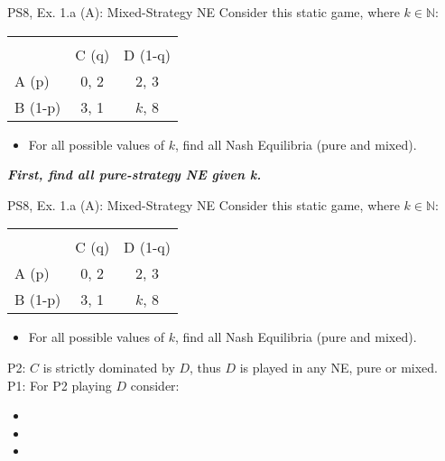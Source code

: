 \begin{frame}{PS8, Ex. 1.a (A): Mixed-Strategy NE}
    Consider this static game, where $k\in\mathbb{N}:$
    \vspace{-16pt}
    \begin{table}
      \begin{tabular}{l|c|c|}
        \multicolumn{1}{c}{} & \multicolumn{2}{c}{} \\
        \multicolumn{1}{c}{} & \multicolumn{1}{c}{C (q)} & \multicolumn{1}{c}{D (1-q)} \\\cline{2-3}
        A (p)   & 0, 2 & 2, 3 \\\cline{2-3}
        B (1-p) & 3, 1 & $k$, 8 \\\cline{2-3}
      \end{tabular}
    \end{table}
    \begin{itemize}
      \item[(a)] For all possible values of $k$, find all Nash Equilibria (pure and mixed).
    \end{itemize}
    \textbf{\textit{First, find all pure-strategy NE given k.}}
    \vfill\null
\end{frame}
\begin{frame}{PS8, Ex. 1.a (A): Mixed-Strategy NE}
      Consider this static game, where $k\in\mathbb{N}:$
      \vspace{-16pt}
      \begin{table}
        \begin{tabular}{l|c|c|}
          \multicolumn{1}{c}{} & \multicolumn{2}{c}{} \\
          \multicolumn{1}{c}{} & \multicolumn{1}{c}{C (q)} & \multicolumn{1}{c}{\color{blue}D (1-q)} \\\cline{2-3}
          A (p)   & 0, 2 & 2, \color{blue}3 \\\cline{2-3}
          B (1-p) & 3, 1 & $k$, \color{blue}8 \\\cline{2-3}
        \end{tabular}
      \end{table}
      \begin{itemize}
        \item[(a)] For all possible values of $k$, find all Nash Equilibria (pure and mixed).
      \end{itemize}
      P2: $C$ is strictly dominated by $D$, thus $D$ is played in any NE, pure or mixed.\\\medskip
      P1: For P2 playing $D$ consider:
      \begin{itemize}
        \item[$k=$1:]
        \item[$k=$2:]
        \item[$k\geq$3:]
      \end{itemize}
      \vfill\null
\end{frame}
